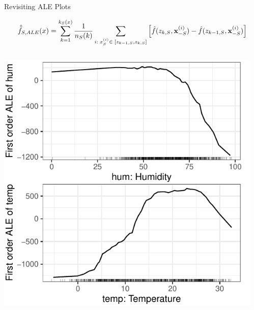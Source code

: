 \documentclass[10pt,compress,t,notes=noshow, xcolor=table]{beamer}
\begin{document}

    

\begin{frame}{Revisiting ALE Plots}

    \[
    \hat{\tilde{f}}_{S, ALE}(x) = \sum_{k = 1}^{k_S(x)}\frac{1}{n_S(k)}\sum_{i: \; x_S^{(i)} \in \; [z_{k-1, S}, z_{k, S}]}\left[\hat{f}(z_{k, S}, \mathbf{x}^{(i)}_{-S}) -\hat{f}(z_{k-1, S}, \mathbf{x}^{(i)}_{-S})\right]
    \]

    \begin{columns}[c, totalwidth=\linewidth]
    \begin{column}{0.5\textwidth}
        \includegraphics{figure/ale1d}
    \end{column}
    \begin{column}{0.5\textwidth}

\end{column}
\end{columns}
\end{frame}
\end{document}
